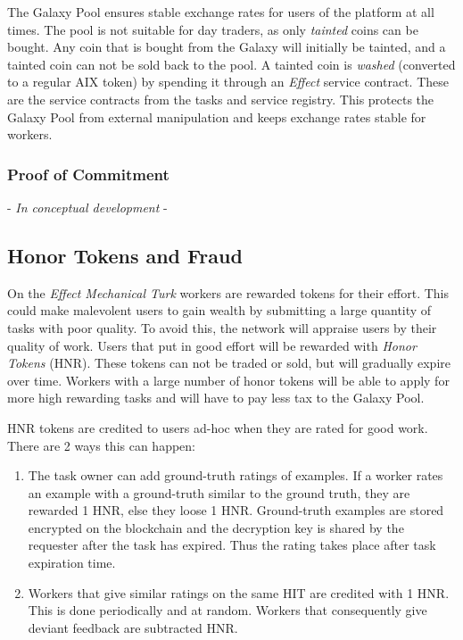 \documentclass{article}
\begin{document}
The Galaxy Pool ensures stable exchange rates for users of the
platform at all times. The pool is not suitable for day traders, as
only \emph{tainted} coins can be bought. Any coin that is bought from
the Galaxy will initially be tainted, and a tainted coin can not be
sold back to the pool. A tainted coin is \emph{washed} (converted to a
regular AIX token) by spending it through an \emph{Effect} service
contract. These are the service contracts from the tasks and service
registry. This protects the Galaxy Pool from external manipulation and
keeps exchange rates stable for workers.

\subsubsection{Proof of Commitment}
\label{subsec:commitment}
- \emph{In conceptual development} -

\subsection{Honor Tokens and Fraud}
On the \emph{Effect Mechanical Turk} workers are rewarded tokens for
their effort. This could make malevolent users to gain wealth by
submitting a large quantity of tasks with poor quality. To avoid this,
the network will appraise users by their quality of work. Users that
put in good effort will be rewarded with \emph{Honor Tokens} (HNR). These
tokens can not be traded or sold, but will gradually expire over
time. Workers with a large number of honor tokens will be able to
apply for more high rewarding tasks and will have to pay less tax to the
Galaxy Pool.

HNR tokens are credited to users ad-hoc when they are rated for good
work. There are 2 ways this can happen:

\begin{enumerate}
\item The task owner can add ground-truth ratings of examples. If a
  worker rates an example with a ground-truth similar to the ground
  truth, they are rewarded 1 HNR, else they loose 1 HNR. Ground-truth
  examples are stored encrypted on the blockchain and the decryption
  key is shared by the requester after the task has expired. Thus the
  rating takes place after task expiration time.
\item Workers that give similar ratings on the same HIT are credited
  with 1 HNR. This is done periodically and at random. Workers that
  consequently give deviant feedback are subtracted HNR.
\end{enumerate}
\end{document}
